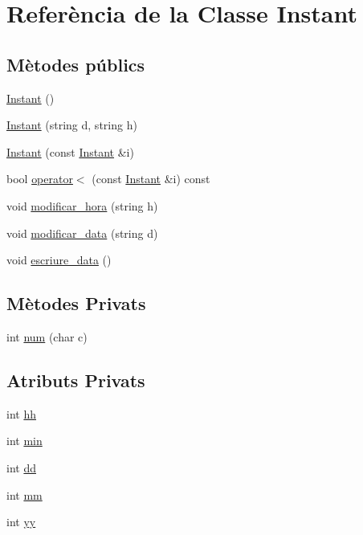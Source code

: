 \hypertarget{class_instant}{}\section{Referència de la Classe Instant}
\label{class_instant}
\subsection*{Mètodes públics}
\begin{DoxyCompactItemize}
\item 
\hyperlink{class_instant_aff8f53e252e3db55883cedf3f2ab46ce}{Instant} ()
\item 
\hyperlink{class_instant_ad49e0d8095a5f9be466421641ca71a8b}{Instant} (string d, string h)
\item 
\hyperlink{class_instant_a2ce98e9c5d48920816a530d9aacb0f27}{Instant} (const \hyperlink{class_instant}{Instant} \&i)
\item 
bool \hyperlink{class_instant_ad3dbbdcb8f7cce6bf28bd109a4b6cbc2}{operator$<$} (const \hyperlink{class_instant}{Instant} \&i) const 
\item 
void \hyperlink{class_instant_a9f5b85dfca181715c6814b492b357c70}{modificar\+\_\+hora} (string h)
\item 
void \hyperlink{class_instant_a7db61132a491c96b02c60f6b68ead889}{modificar\+\_\+data} (string d)
\item 
void \hyperlink{class_instant_a5dc8fbbbaeb033472b6f17262b60f4a7}{escriure\+\_\+data} ()
\end{DoxyCompactItemize}
\subsection*{Mètodes Privats}
\begin{DoxyCompactItemize}
\item 
int \hyperlink{class_instant_a746f521daeb12b3b1d67d1c4ac19a4bc}{num} (char c)
\end{DoxyCompactItemize}
\subsection*{Atributs Privats}
\begin{DoxyCompactItemize}
\item 
int \hyperlink{class_instant_a56ada80c1afff9825a0003f7253795d1}{hh}
\item 
int \hyperlink{class_instant_a4de33b0ded8540ec7a903ab5763eccca}{min}
\item 
int \hyperlink{class_instant_acc6e1db1f2f2f12a87a865d6849f1b2b}{dd}
\item 
int \hyperlink{class_instant_a2912b4df6ae47c81da8f5e041ddc2266}{mm}
\item 
int \hyperlink{class_instant_a67fe547756040a8d5d9088c9827bedba}{yy}
\end{DoxyCompactItemize}


